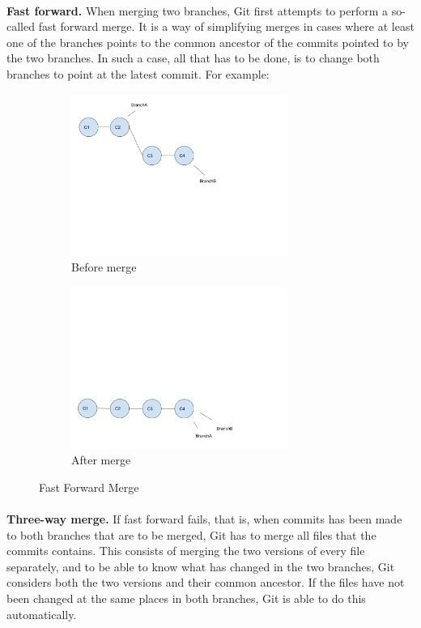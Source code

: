 \paragraph*{}
\textbf{Fast forward.} When merging two branches, Git first attempts to perform a so-called fast forward merge. It is a way of simplifying merges in cases where at least one of the branches points to the common ancestor of the commits pointed to by the two branches. In such a case, all that has to be done, is to change both branches to point at the latest commit. For example:\\
\begin{figure}
    \centering
    \begin{subfigure}[b]{0.3\textwidth}
        \includegraphics[width=200pt]{figure/ff1.png}
        \caption{Before merge}
        \label{fig:branch1}
    \end{subfigure}
    \begin{subfigure}[b]{0.3\textwidth}
        \includegraphics[width=200pt]{figure/ff2.png}
        \caption{After merge}
        \label{fig:branch3}
    \end{subfigure}
    \caption{Fast Forward Merge}\label{fig:branches}
\end{figure}
\paragraph*{}
\textbf{Three-way merge.} If fast forward fails, that is, when commits has been made to both branches that are to be merged, Git has to merge all files that the commits contains. This consists of merging the two versions of every file separately, and to be able to know what has changed in the two branches, Git considers both the two versions and their common ancestor. If the files have not been changed at the same places in both branches, Git is able to do this automatically.
